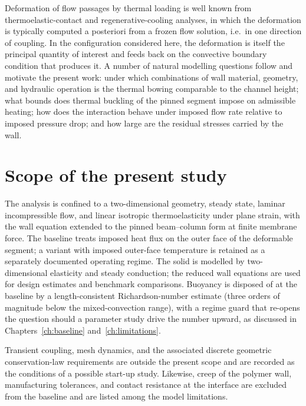 Deformation of flow passages by thermal loading is well known from thermoelastic-contact and
regenerative-cooling analyses, in which the deformation is typically computed a posteriori from a
frozen flow solution, i.e.\ in one direction of coupling. In the configuration considered here, the
deformation is itself the principal quantity of interest and feeds back on the convective boundary
condition that produces it. A number of natural modelling questions follow and motivate the present
work: under which combinations of wall material, geometry, and hydraulic operation is the thermal
bowing comparable to the channel height; what bounds does thermal buckling of the pinned segment
impose on admissible heating; how does the interaction behave under imposed flow rate relative to
imposed pressure drop; and how large are the residual stresses carried by the wall.

\section{Scope of the present study}
The analysis is confined to a two-dimensional geometry, steady state, laminar incompressible flow,
and linear isotropic thermoelasticity under plane strain, with the wall equation extended to the
pinned beam--column form at finite membrane force. The baseline treats imposed heat flux on
the outer face of the deformable segment; a variant with imposed outer-face temperature is retained
as a separately documented operating regime. The solid is modelled by two-dimensional elasticity and
steady conduction; the reduced wall equations are used for design estimates
and benchmark comparisons. Buoyancy is disposed of at the baseline by a length-consistent
Richardson-number estimate (three orders of magnitude below the mixed-convection range), with a
regime guard that re-opens the question should a parameter study drive the number upward, as
discussed in Chapters~\ref{ch:baseline} and~\ref{ch:limitations}.

Transient coupling, mesh dynamics, and the associated discrete geometric conservation-law
requirements \cite{lesoinne1996geometric} are outside the present scope and are recorded as the
conditions of a possible start-up study. Likewise, creep of the polymer wall, manufacturing
tolerances, and contact resistance at the interface are excluded from the baseline and are listed
among the model limitations.

